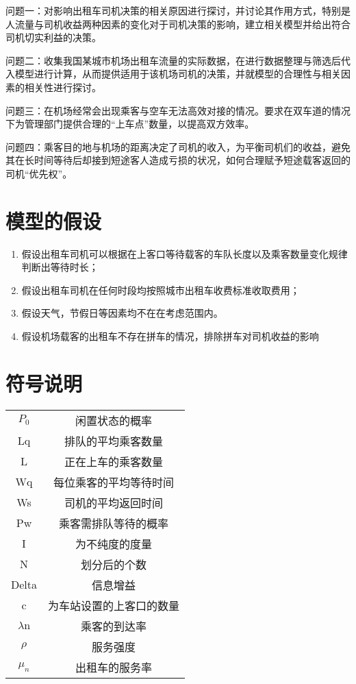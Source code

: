 \documentclass[withoutpreface,bwprint]{cumcmthesis} %
\begin{document}
问题一：对影响出租车司机决策的相关原因进行探讨，并讨论其作用方式，特别是人流量与司机收益两种因素的变化对于司机决策的影响，建立相关模型并给出符合司机切实利益的决策。

问题二：收集我国某城市机场出租车流量的实际数据，在进行数据整理与筛选后代入模型进行计算，从而提供适用于该机场司机的决策，并就模型的合理性与相关因素的相关性进行探讨。

问题三：在机场经常会出现乘客与空车无法高效对接的情况。要求在双车道的情况下为管理部门提供合理的“上车点”数量，以提高双方效率。

问题四：乘客目的地与机场的距离决定了司机的收入，为平衡司机们的收益，避免其在长时间等待后却接到短途客人造成亏损的状况，如何合理赋予短途载客返回的司机“优先权”。
\section{模型的假设}
\begin{enumerate}
	\item 假设出租车司机可以根据在上客口等待载客的车队长度以及乘客数量变化规律判断出等待时长；
	\item 假设出租车司机在任何时段均按照城市出租车收费标准收取费用；
	\item 假设天气，节假日等因素均不在在考虑范围内。
	\item 假设机场载客的出租车不存在拼车的情况，排除拼车对司机收益的影响
\end{enumerate}

\section{符号说明}
\begin{center}
	\begin{tabular}{cc}
		\hline
		\makebox[0.3\textwidth][c]{符号}	&  \makebox[0.4\textwidth][c]{意义} \\ \hline
		$P_0$	    & 闲置状态的概率\\ \hline
		Lq	    & 排队的平均乘客数量\\ \hline
		L     & 正在上车的乘客数量\\ \hline
		Wq     &  每位乘客的平均等待时间\\ \hline
		Ws	    & 司机的平均返回时间\\ \hline
		Pw	    & 乘客需排队等待的概率\\ \hline
		I	    & 为不纯度的度量\\ \hline
		N   & 划分后的个数\\ \hline
		Delta	    & 信息增益\\ \hline
		c   & 为车站设置的上客口的数量\\ \hline
		$\lambda \mathrm{n}$   & 乘客的到达率\\ \hline
		$\rho$   & 服务强度\\ \hline
		$\mu_{n}$   & 出租车的服务率\\ \hline
		
	\end{tabular}
\end{center}
\end{document}

